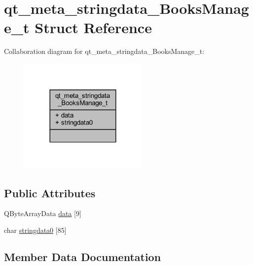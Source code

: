 \hypertarget{structqt__meta__stringdata___books_manage__t}{}\section{qt\+\_\+meta\+\_\+stringdata\+\_\+\+Books\+Manage\+\_\+t Struct Reference}
\label{structqt__meta__stringdata___books_manage__t}


Collaboration diagram for qt\+\_\+meta\+\_\+stringdata\+\_\+\+Books\+Manage\+\_\+t\+:
\nopagebreak
\begin{figure}[H]
\begin{center}
\leavevmode
\includegraphics[width=180pt]{structqt__meta__stringdata___books_manage__t__coll__graph}
\end{center}
\end{figure}
\subsection*{Public Attributes}
\begin{DoxyCompactItemize}
\item 
Q\+Byte\+Array\+Data \mbox{\hyperlink{structqt__meta__stringdata___books_manage__t_aa543a18eb1f82a79632e3c065c53a72a}{data}} \mbox{[}9\mbox{]}
\item 
char \mbox{\hyperlink{structqt__meta__stringdata___books_manage__t_a26430339977d3ad1d58a7283bf014864}{stringdata0}} \mbox{[}85\mbox{]}
\end{DoxyCompactItemize}


\subsection{Member Data Documentation}
\mbox{\label{structqt__meta__stringdata___books_manage__t_aa543a18eb1f82a79632e3c065c53a72a}} 
